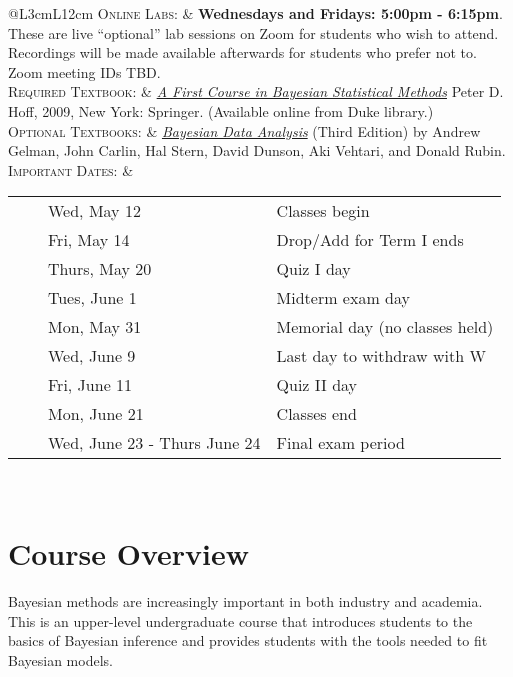 \documentclass[11pt, a4paper]{article}
\newcommand{\tabitem}{~~\llap{\textbullet}~~}
\begin{document}
\begin{center}
\begin{minipage}[t]{.9\textwidth}
\begin{tabular}{@{}L{3cm}L{12cm}}
			\textsc{Online Labs:} & \textbf{Wednesdays and Fridays: 5:00pm - 6:15pm}. These are live ``optional'' lab sessions on Zoom  for students who wish to attend. Recordings will be made available afterwards for students who prefer not to. Zoom meeting IDs TBD. \\
			\textsc{Required Textbook:} & \href{https://find.library.duke.edu/catalog/DUKE004968562}{\textit{A First Course in Bayesian Statistical Methods}} Peter D. Hoff, 2009, New York: Springer. (Available online from Duke library.)\\
			\textsc{Optional Textbooks:}	& \href{http://www.amazon.com/Bayesian-Analysis-Chapman-Statistical-Science/dp/1439840954/}{\textit{Bayesian Data Analysis}} (Third Edition) by Andrew Gelman, John Carlin, Hal Stern, David Dunson, Aki Vehtari, and Donald Rubin. \\
			\textsc{Important Dates:} & \begin{minipage}[t]{.9\textwidth}
				\begin{tabular}{@{}ll}
					\tabitem Wed, May 12 & Classes begin \\
					\tabitem Fri, May 14 & Drop/Add for Term I ends \\
					\tabitem Thurs, May 20 & Quiz I day\\
					\tabitem Tues, June 1 & Midterm exam day\\
					\tabitem Mon, May 31 & Memorial day (no classes held) \\
					\tabitem Wed, June 9 & Last day to withdraw with W \\
					\tabitem Fri, June 11 & Quiz II day\\
					\tabitem Mon, June 21 & Classes end \\
					\tabitem Wed, June 23 - Thurs June 24 & Final exam period \\
				\end{tabular}
			\end{minipage} \\
			\bottomrule[0.065cm]
		\end{tabular}
	\end{minipage}
\end{center}





\vspace{.5cm}
\setlength{\unitlength}{1in}
\renewcommand{\arraystretch}{1.5}



\section{Course Overview}
Bayesian methods are increasingly important in both industry and academia. This is an upper-level undergraduate course that introduces students to the basics of Bayesian inference and provides students with the tools needed to fit Bayesian models.
\end{document}
